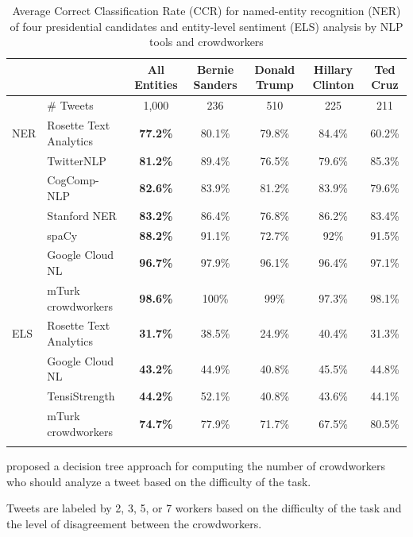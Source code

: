 \documentclass[11pt,a4paper]{article}
\begin{document}
\begin{table}[ht]
\begin{center}
{\small 
\centering
\caption{Average Correct Classification Rate (CCR) for named-entity recognition (NER) of four presidential candidates and entity-level sentiment (ELS) analysis by NLP tools and crowdworkers}
\vspace{0.2cm}
\begin{tabular}{ll|c|cccc}
   & &  All Entities & Bernie Sanders & Donald Trump & Hillary Clinton & Ted Cruz \\
   \hline
 & \# Tweets & 1,000 & 236 & 510 & 225 & 211 \\
  \hline
NER & Rosette Text Analytics & \textbf{77.2\%} & 80.1\% & 79.8\% & 84.4\% & 60.2\% \\ 
& TwitterNLP & \textbf{81.2\%} & 89.4\% & 76.5\% & 79.6\% & 85.3\%  \\ 
& CogComp-NLP & \textbf{82.6\%} & 83.9\% & 81.2\% &  83.9\% & 79.6\%  \\

 & Stanford NER & \textbf{83.2\%} & 86.4\% & 76.8\% & 86.2\% & 83.4\%  \\
 & spaCy & \textbf{88.2\%} & 91.1\% & 72.7\% & 92\% & 91.5\%  \\
 & Google Cloud NL & \textbf{96.7\%} & 97.9\% & 96.1\% & 96.4\% & 97.1\% \\ 
 & mTurk crowdworkers & \textbf{98.6\%} & 100\% & 99\% & 97.3\% & 98.1\%  \\
  \hline
ELS & Rosette Text Analytics & \textbf{31.7\%} & 38.5\% & 24.9\% & 40.4\% & 31.3\% \\
& Google Cloud NL & \textbf{43.2\%} & 44.9\% & 40.8\% & 45.5\% & 44.8\% \\ 
& TensiStrength & \textbf{44.2\%} & 52.1\% & 40.8\% & 43.6\% & 44.1\%  \\

 & mTurk crowdworkers & \textbf{74.7\%}  & 77.9\% & 71.7\% & 67.5\% & 80.5\% \\
  \\
\end{tabular}
}
\end{center}
\end{table}



\citet{SamekiGeMaGuBe16} proposed a decision tree approach for computing the number of crowdworkers who should analyze a tweet based on the difficulty of the task. 

Tweets are labeled by 2, 3, 5, or 7 workers based on the difficulty of the task and the level of disagreement between the crowdworkers.
\end{document}
